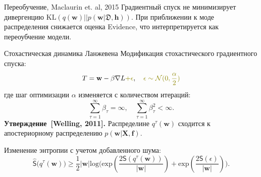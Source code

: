\documentclass[usenames,dvipsnames,10pt,pdf,utf8,russian,aspectratio=43]{beamer}
\begin{document}
\begin{frame}{Переобучение,  Maclaurin et. al, 2015}
Градиентный спуск не минимизирует дивергенцию $\text{KL}(q(\mathbf{w})||p(\mathbf{w}| \mathfrak{D}, \mathbf{h}))$. При приближении к моде распределения снижается оценка Evidence, что интерпретируется как переоубчение модели.

\begin{figure}
  \centering
\label{fig:1}\qquad
\end{figure}
\end{frame}

\begin{frame}{Стохастическая динамика Ланжевена}
Модификация стохастического градиентного спуска:
\[
	T =\mathbf{w} -  \beta  \nabla  L  \textcolor{olive}{+ \epsilon}, \quad   \textcolor{olive}{\epsilon \sim  \mathcal{N}({0},{\frac{\alpha}{2}})}
\]
где шаг оптимизации $\alpha$ изменяется с количеством итераций:
\[
	\sum_{\tau=1}^\infty \beta_\tau = \infty, \quad \sum_{\tau=1}^\infty \beta_\tau^2 < \infty.
\]
\textbf{Утверждение~[Welling, 2011].} Распределине $q^\tau(\mathbf{w})$ сходится к апостериорному распределению $p(\mathbf{w} | \mathbf{X},\mathbf{f})$.


Изменение энтропии с учетом добавленного шума:
\[
\hat{\mathsf{S}}\bigl(q^\tau(\mathbf{w})\bigr)   \geq \frac{1}{2}|\mathbf{w}|\text{log}\bigl(\text{exp}(\frac{2\mathsf{S}(q^\tau(\mathbf{w}))}{|\mathbf{w}|}) + \text{exp}(\frac{2\mathsf{S}( \epsilon)}{|\mathbf{w}|})\bigr).
\]
\end{frame}
\end{document}
